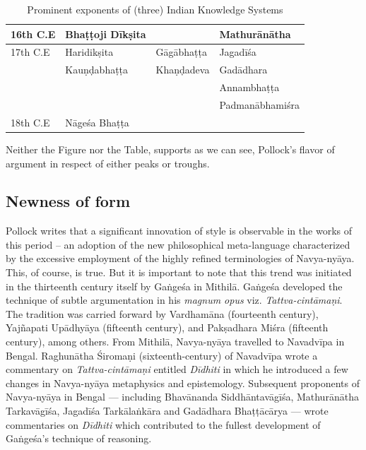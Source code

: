\begin{table}[H]
\begin{tabular}{|l|l|l|l|}
16th C.E & Bhaṭṭoji Dīkṣita\index{Bhattoji Diksita@Bhaṭṭoji Dīkṣita} & & Mathurānātha\\\hline
17th C.E & Haridikṣita & Gāgābhaṭṭa\index{Gagabhatta@Gāgābhaṭṭa} & Jagadīśa\\\hline
& Kauṇḍabhaṭṭa\index{Kaundabhatta@Kauṇḍabhaṭṭa} & Khaṇḍadeva & Gadādhara\index{Gadadhara@Gadādhara}\\\hline
& & & Annambhaṭṭa\index{Annambhatta@Annambhaṭṭa}\\\hline
& & & Padmanābhamiśra\\\hline
18th C.E  & Nāgeśa Bhaṭṭa\index{Nagesabhatta@Nāgeśabhaṭṭa} & & \\\hline
\end{tabular}
\caption{Prominent exponents of (three) Indian Knowledge Systems}\label{chap2-tab1}
\end{table}

\newpage

Neither the Figure nor the Table, supports as we can see, Pollock’s flavor of argument in respect of either peaks or troughs.

\subsection{Newness of form}%

Pollock writes that a significant innovation of style is observable in the works of this period – an adoption of the new philosophical meta-language characterized by the excessive employment of the highly refined terminologies of Navya-nyāya. This, of course, is true. But it is important to note that this trend was initiated in the thirteenth century itself by Gaṅgeśa in Mithilā. Gaṅgeśa developed the technique of subtle argumentation in his {\sl magnum opus}  viz. {\sl Tattva-cintāmaṇi}. The tradition was carried forward by Vardhamāna (fourteenth century), Yajñapati Upādhyāya (fifteenth century), and Pakṣadhara Miśra (fifteenth century), among others. From Mithilā, Navya-nyāya travelled to Navadvīpa in Bengal. Raghunātha Śiromaṇi (sixteenth-century) of Navadvīpa wrote a commentary on {\sl Tattva-cintāmaṇi} entitled {\sl Dīdhiti} in which he introduced a few changes in Navya-nyāya metaphysics and epistemology. Subsequent proponents of Navya-nyāya in Bengal — including Bhavānanda Siddhāntavāgīśa, Mathurānātha Tarkavāgīśa, Jagadīśa Tarkālaṅkāra and Gadādhara Bhaṭṭācārya — wrote commentaries on {\sl Dīdhiti} which contributed to the fullest development of Gaṅgeśa’s technique of reasoning. 


